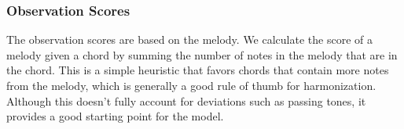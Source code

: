 \subsubsection{Observation Scores}

The observation scores are based on the melody. We calculate the score of a melody given a chord by summing the number of notes in the melody that are in the chord. This is a simple heuristic that favors chords that contain more notes from the melody, which is generally a good rule of thumb for harmonization. Although this doesn't fully account for deviations such as passing tones, it provides a good starting point for the model.
